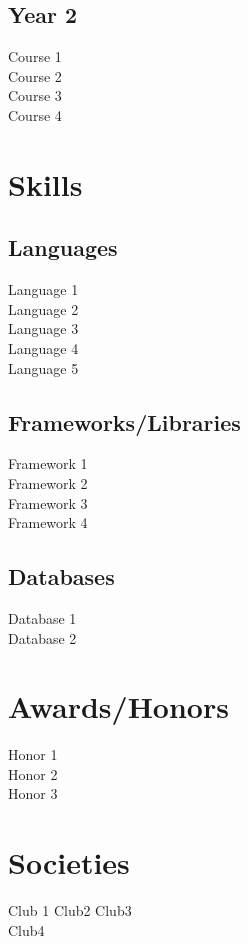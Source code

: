 \documentclass[]{deedy-resume-openfont}
\begin{document}
\begin{minipage}[t]{0.33\textwidth}
\subsection{Year 2}
Course 1 \\
Course 2 \\
Course 3 \\
Course 4
\sectionsep


\section{Skills}
\subsection{Languages} %
\textbullet{} Language 1  \\
\textbullet{} Language 2\\
\textbullet{} Language 3\\
\textbullet{} Language 4\\
\textbullet{} Language 5 \\
\sectionsep
\subsection{Frameworks/Libraries} %
\textbullet{} Framework 1  \\
\textbullet{} Framework 2 \\
\textbullet{} Framework 3 \\
\textbullet{} Framework 4 \\
\sectionsep
\subsection{Databases}  %
\textbullet{} Database 1 \\
\textbullet{} Database 2


\sectionsep

\section{Awards/Honors}
\textbullet{} Honor 1 \\
\textbullet{} Honor 2\\
\textbullet{} Honor 3\\

\sectionsep

\section{Societies}
Club 1 \textbullet{} Club2 \textbullet{} Club3 \textbullet{} \\ Club4

%
%

\end{minipage}
\end{document}
